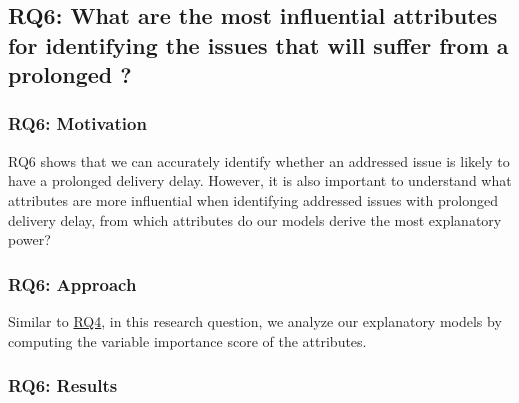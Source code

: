 
\subsection{RQ6: What are the most influential attributes for                        
	identifying the issues that will suffer from a prolonged \DIFdelbegin {}\DIFdelend \DIFaddbegin {}\DIFaddend ?}\label{ch4:rq6}                                                                    

\subsubsection*{RQ6: Motivation} RQ6 shows that we can accurately                    
identify whether an addressed issue is likely to have a prolonged delivery delay.         
However, it is also important to understand what attributes are more influential    
when identifying addressed issues with prolonged delivery delay, \ie from which attributes 
do our models derive the most explanatory power?                                    

\subsubsection*{RQ6: Approach} Similar to \hyperref[ch4:rq4]{RQ4}, in this research
question, we analyze our explanatory models by computing the variable importance
score of the attributes.                                                                         

\subsubsection*{RQ6: Results}

